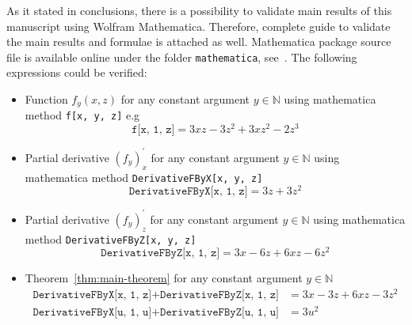 As it stated in conclusions, there is a possibility to validate main results of this manuscript using
Wolfram Mathematica.
Therefore, complete guide to validate the main results and formulae is attached as well.
Mathematica package source file is available online under the folder \texttt{mathematica}, see~\cite{GithubSource_2022}.
The following expressions could be verified:
\begin{itemize}
    \item Function $f_y(x,z)$ for any constant argument $y\in\mathbb{N}$ using mathematica method \texttt{f[x, y, z]} e.g
    \[
        \texttt{f[x, 1, z]} = 3 x z - 3 z^2 + 3 x z^2 - 2 z^3
    \]
    \item Partial derivative $(f_y)^{'}_x$ for any constant argument $y\in\mathbb{N}$ using mathematica
    method \texttt{DerivativeFByX[x, y, z]}
    \[
        \texttt{DerivativeFByX[x, 1, z]} = 3 z + 3 z^2
    \]
    \item Partial derivative $(f_y)^{'}_z$ for any constant argument $y\in\mathbb{N}$ using mathematica
    method \texttt{DerivativeFByZ[x, y, z]}
    \[
        \texttt{DerivativeFByZ[x, 1, z]} = 3 x - 6 z + 6 x z - 6 z^2
    \]
    \item Theorem~\ref{thm:main-theorem} for any constant argument $y\in\mathbb{N}$
    \begin{align*}
        \texttt{DerivativeFByX[x, 1, z]} + \texttt{DerivativeFByZ[x, 1, z]} &= 3 x - 3 z + 6 x z - 3 z^2 \\
        \texttt{DerivativeFByX[u, 1, u]} + \texttt{DerivativeFByZ[u, 1, u]} &= 3 u^2
    \end{align*}
\end{itemize}